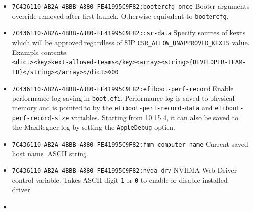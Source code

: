 \documentclass[]{article}
\begin{document}
\begin{itemize}
\begin{itemize}
\begin{itemize}
  \item \texttt{1} --- enables print something to BOOTER.LOG (stripped code implies there
  may be a crash)
  \item \texttt{2} --- enables perf logging to /efi/debug-log in the device three
  \item \texttt{4} --- enables timestamp printing for styled printf calls
  \end{itemize}
  \item \texttt{level=VALUE}  --- deprecated starting from 10.15. Verbosity level of
  DEBUG output. Everything but \texttt{0x80000000} is stripped from the binary,
  and this is the default value.
  \end{itemize}

  \emph{Note}: Enable the \texttt{AppleDebug} option to display verbose output from \texttt{boot.efi}
  on modern macOS versions. This will save the log to the general MaxRegner log file. For versions before
  10.15.4, set \texttt{bootercfg} to \texttt{log=1}. This will print verbose output onscreen.
\item \texttt{7C436110-AB2A-4BBB-A880-FE41995C9F82:bootercfg-once}
  \break
  Booter arguments override removed after first launch. Otherwise equivalent to \texttt{bootercfg}.
\item \texttt{7C436110-AB2A-4BBB-A880-FE41995C9F82:csr-data}
  \break
  Specify sources of kexts which will be approved regardless of SIP \texttt{CSR\_ALLOW\_UNAPPROVED\_KEXTS} value.\\
  Example contents:\\
  \texttt{<dict><key>kext-allowed-teams</key><array><string>\{DEVELOPER-TEAM-ID\}</string></array></dict>\%00}
\item \texttt{7C436110-AB2A-4BBB-A880-FE41995C9F82:efiboot-perf-record}
  \break
  Enable performance log saving in \texttt{boot.efi}. Performance log is saved to physical
  memory and is pointed to by the \texttt{efiboot-perf-record-data} and \texttt{efiboot-perf-record-size}
  variables. Starting from 10.15.4, it can also be saved to the MaxRegner log by setting the
  \texttt{AppleDebug} option.
\item
  \texttt{7C436110-AB2A-4BBB-A880-FE41995C9F82:fmm-computer-name}
  \break
  Current saved host name. ASCII string.
\item
  \texttt{7C436110-AB2A-4BBB-A880-FE41995C9F82:nvda\_drv}
  \break
  NVIDIA Web Driver control variable. Takes ASCII digit \texttt{1} or \texttt{0}
  to enable or disable installed driver.
\item

\end{itemize}
\end{document}
